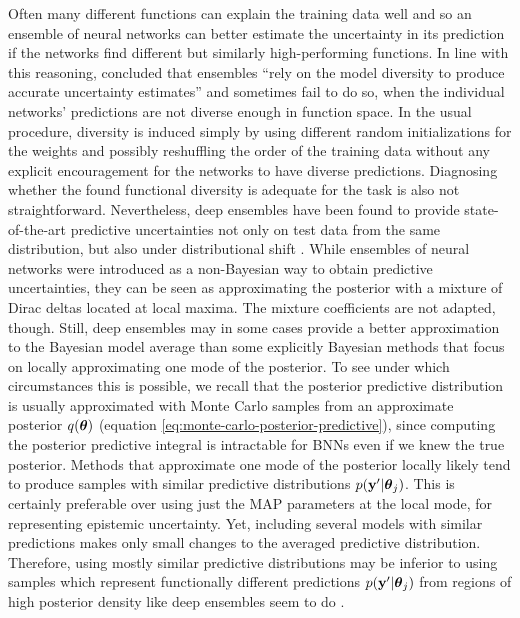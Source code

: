 \documentclass[../thesis.tex]{subfiles}
\begin{document}
Often many different functions can explain the training data well and so an ensemble of neural networks can better estimate the uncertainty in its prediction if the networks find different but similarly high-performing functions. In line with this reasoning, \textcite{yao2019quality} concluded that ensembles ``rely on the model diversity to produce accurate uncertainty estimates'' and sometimes fail to do so, when the individual networks' predictions are not diverse enough in function space. In the usual procedure, diversity is induced simply by using different random initializations for the weights and possibly reshuffling the order of the training data without any explicit encouragement for the networks to have diverse predictions. Diagnosing whether the found functional diversity is adequate for the task is also not straightforward.
Nevertheless, deep ensembles have been found to provide state-of-the-art predictive uncertainties not only on test data from the same distribution, but also under distributional shift \parencite{ovadia2019can}. 
While ensembles of neural networks were introduced as a non-Bayesian way to obtain predictive uncertainties, they can be seen as approximating the posterior with a mixture of Dirac deltas located at local maxima. The mixture coefficients are not adapted, though. Still, deep ensembles may in some cases provide a better approximation to the Bayesian model average than some explicitly Bayesian methods that focus on locally approximating one mode of the posterior. To see under which circumstances this is possible, we recall that the posterior predictive distribution is usually approximated with Monte Carlo samples from an approximate posterior $q(\boldsymbol{\mathbf{\theta}})$ (equation \ref{eq:monte-carlo-posterior-predictive}), since computing the posterior predictive integral is intractable for BNNs even if we knew the true posterior.
Methods that approximate one mode of the posterior locally likely tend to produce samples with similar predictive distributions $p(\boldsymbol{\mathbf{y}}' | \boldsymbol{\mathbf{\theta}}_j)$. This is certainly preferable over using just the MAP parameters at the local mode, for representing epistemic uncertainty. Yet, including several models with similar predictions makes only small changes to the averaged predictive distribution. Therefore, using mostly similar predictive distributions may be inferior to using samples which represent functionally different predictions $p(\boldsymbol{\mathbf{y}}' | \boldsymbol{\mathbf{\theta}}_j)$ from regions of high posterior density like deep ensembles seem to do \parencite{wilson2020case}. 
\end{document}
